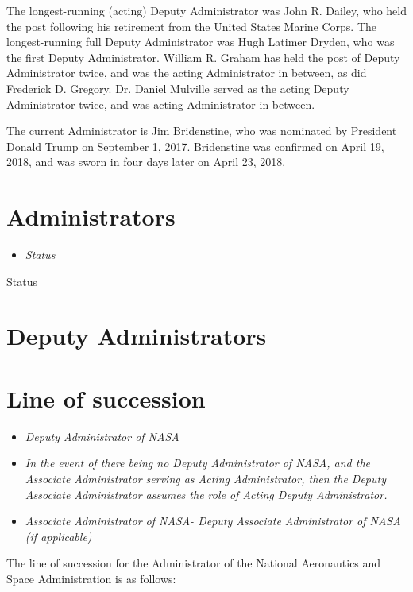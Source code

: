 The longest-running (acting) Deputy Administrator was John R. Dailey,
who held the post following his retirement from the United States Marine
Corps. The longest-running full Deputy Administrator was Hugh Latimer
Dryden, who was the first Deputy Administrator. William R. Graham has
held the post of Deputy Administrator twice, and was the acting
Administrator in between, as did Frederick D. Gregory. Dr. Daniel
Mulville served as the acting Deputy Administrator twice, and was acting
Administrator in between.

The current Administrator is Jim Bridenstine, who was nominated by
President Donald Trump on September 1, 2017. Bridenstine was confirmed
on April 19, 2018, and was sworn in four days later on April 23, 2018.

\section{Administrators}\label{administrators}

\begin{itemize}
\item
  \emph{Status}
\end{itemize}

Status

\section{Deputy Administrators}\label{deputy-administrators}

\section{Line of succession}\label{line-of-succession}

\begin{itemize}
\item
  \emph{Deputy Administrator of NASA}
\item
  \emph{In the event of there being no Deputy Administrator of NASA, and
  the Associate Administrator serving as Acting Administrator, then the
  Deputy Associate Administrator assumes the role of Acting Deputy
  Administrator.}
\item
  \emph{Associate Administrator of NASA- Deputy Associate Administrator
  of NASA (if applicable)}
\end{itemize}

The line of succession for the Administrator of the National Aeronautics
and Space Administration is as follows:

